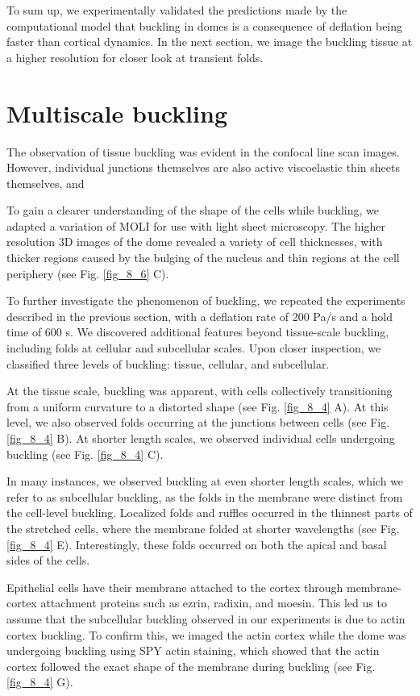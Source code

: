 To sum up, we experimentally validated the predictions made by the computational model that buckling in domes is a consequence of deflation being faster than cortical dynamics. In the next section, we image the buckling tissue at a higher resolution for closer look at transient folds.


\hypertarget{multiscale-buckling}{%
	\section{Multiscale buckling}\label{multiscale-buckling}}

The observation of tissue buckling was evident in the confocal line scan images. However, individual junctions themselves are also active viscoelastic thin sheets themselves, and 


To gain a clearer understanding of the shape of the cells while buckling, we adapted a variation of MOLI for use with light sheet microscopy. The higher resolution 3D images of the dome revealed a variety of cell thicknesses, with thicker regions caused by the bulging of the nucleus and thin regions at the cell periphery (see Fig. \ref{fig_8_6} C).

To further investigate the phenomenon of buckling, we repeated the experiments described in the previous section, with a deflation rate of 200 Pa/s and a hold time of 600 s. We discovered additional features beyond tissue-scale buckling, including folds at cellular and subcellular scales. Upon closer inspection, we classified three levels of buckling: tissue, cellular, and subcellular.

At the tissue scale, buckling was apparent, with cells collectively transitioning from a uniform curvature to a distorted shape (see Fig. \ref{fig_8_4} A). At this level, we also observed folds occurring at the junctions between cells (see Fig. \ref{fig_8_4} B). At shorter length scales, we observed individual cells undergoing buckling (see Fig. \ref{fig_8_4} C).

In many instances, we observed buckling at even shorter length scales, which we refer to as subcellular buckling, as the folds in the membrane were distinct from the cell-level buckling. Localized folds and ruffles occurred in the thinnest parts of the stretched cells, where the membrane folded at shorter wavelengths (see Fig. \ref{fig_8_4} E). Interestingly, these folds occurred on both the apical and basal sides of the cells.

Epithelial cells have their membrane attached to the cortex through membrane-cortex attachment proteins such as ezrin, radixin, and moesin. This led us to assume that the subcellular buckling observed in our experiments is due to actin cortex buckling. To confirm this, we imaged the actin cortex while the dome was undergoing buckling using SPY actin staining, which showed that the actin cortex followed the exact shape of the membrane during buckling (see Fig. \ref{fig_8_4} G).

